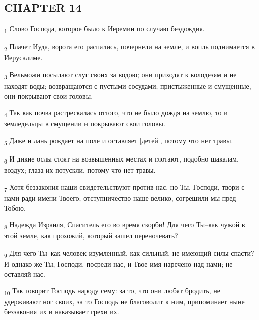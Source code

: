 \subsection{CHAPTER 14}
\begin{tcolorbox}
\textsubscript{1} Слово Господа, которое было к Иеремии по случаю бездождия.
\end{tcolorbox}
\begin{tcolorbox}
\textsubscript{2} Плачет Иуда, ворота его распались, почернели на земле, и вопль поднимается в Иерусалиме.
\end{tcolorbox}
\begin{tcolorbox}
\textsubscript{3} Вельможи посылают слуг своих за водою; они приходят к колодезям и не находят воды; возвращаются с пустыми сосудами; пристыженные и смущенные, они покрывают свои головы.
\end{tcolorbox}
\begin{tcolorbox}
\textsubscript{4} Так как почва растрескалась оттого, что не было дождя на землю, то и земледельцы в смущении и покрывают свои головы.
\end{tcolorbox}
\begin{tcolorbox}
\textsubscript{5} Даже и лань рождает на поле и оставляет [детей], потому что нет травы.
\end{tcolorbox}
\begin{tcolorbox}
\textsubscript{6} И дикие ослы стоят на возвышенных местах и глотают, подобно шакалам, воздух; глаза их потускли, потому что нет травы.
\end{tcolorbox}
\begin{tcolorbox}
\textsubscript{7} Хотя беззакония наши свидетельствуют против нас, но Ты, Господи, твори с нами ради имени Твоего; отступничество наше велико, согрешили мы пред Тобою.
\end{tcolorbox}
\begin{tcolorbox}
\textsubscript{8} Надежда Израиля, Спаситель его во время скорби! Для чего Ты--как чужой в этой земле, как прохожий, который зашел переночевать?
\end{tcolorbox}
\begin{tcolorbox}
\textsubscript{9} Для чего Ты--как человек изумленный, как сильный, не имеющий силы спасти? И однако же Ты, Господи, посреди нас, и Твое имя наречено над нами; не оставляй нас.
\end{tcolorbox}
\begin{tcolorbox}
\textsubscript{10} Так говорит Господь народу сему: за то, что они любят бродить, не удерживают ног своих, за то Господь не благоволит к ним, припоминает ныне беззакония их и наказывает грехи их.
\end{tcolorbox}
